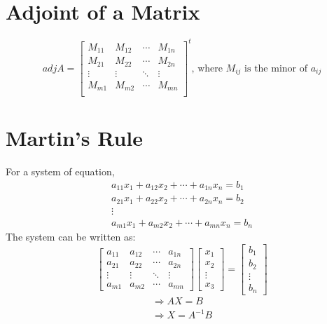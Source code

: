 \section{Adjoint of a Matrix}
\begin{equation}
	adj A=\begin{bmatrix}M_{11}&M_{12}&\cdots&M_{1n}\\ M_{21}&M_{22}&\cdots&M_{2n}\\ \vdots&\vdots&\ddots&\vdots\\M_{m1}&M_{m2}&\cdots&M_{mn}\\ \end{bmatrix}^t\text{, where } M_{ij} \text{ is the minor of } a_{ij}
\end{equation}

\section{Martin's Rule}
For a system of equation,
\begin{align}
	a_{11}x_1+a_{12}x_2+\cdots+a_{1n}x_n=b_1\nonumber\\
	a_{21}x_1+a_{22}x_2+\cdots+a_{2n}x_n=b_2\nonumber\\
	\vdots\nonumber\\
	a_{m1}x_1+a_{m2}x_2+\cdots+a_{mn}x_n=b_n\nonumber
\end{align}
The system can be written as:
\begin{equation}
	\begin{bmatrix}a_{11}&a_{12}&\cdots&a_{1n}\\a_{21}&a_{22}&\cdots&a_{2n}\\ \vdots&\vdots&\ddots&\vdots \\a_{m1}&a_{m2}&\cdots&a_{mn}\end{bmatrix} \begin{bmatrix}x_1\\x_2\\ \vdots \\ x_3\end{bmatrix}=\begin{bmatrix}b_1 \\ b_2 \\ \vdots \\ b_n\end{bmatrix}
\end{equation}
\begin{align}
	\Rightarrow AX=B\\
	\Rightarrow X=A^{-1}B
\end{align}
